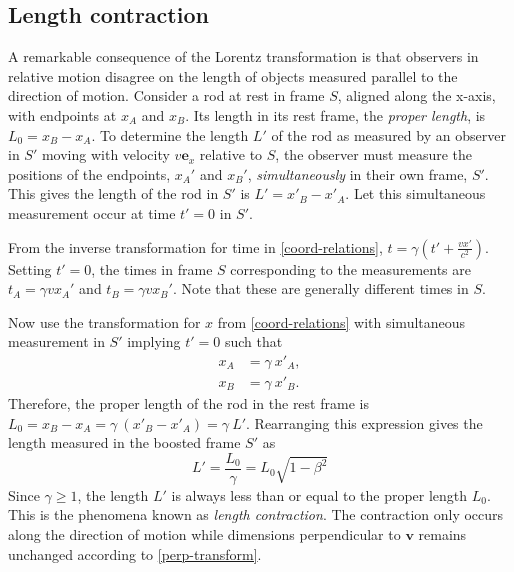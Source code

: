 \documentclass[a4paper]{article}
\begin{document}


\subsection{Length contraction}
A remarkable consequence of the Lorentz transformation is that observers in relative motion disagree on the length of objects measured parallel to the direction of motion. Consider a rod at rest in frame $S$, aligned along the x-axis, with endpoints at $x_A$ and $x_B$. Its length in its rest frame, the \textit{proper length}, is $L_0 = x_B - x_A$. To determine the length $L'$ of the rod as measured by an observer in $S'$ moving with velocity $v \mathbf{e}_x$ relative to $S$, the observer must measure the positions of the endpoints, $x_A'$ and $x_B'$, \textit{simultaneously} in their own frame, $S'$. This gives the length of the rod in $S'$ is $L' = x'_B - x'_A$. Let this simultaneous measurement occur at time $t'=0$ in $S'$.

From the inverse transformation for time in \eqref{coord-relations}, $t = \gamma(t' + \frac{vx'}{c^2})$. Setting $t'=0$, the times in frame $S$ corresponding to the measurements are $t_A = \gamma v x_A'$ and $t_B = \gamma v x_B'$. Note that these are generally different times in $S$. 

Now use the transformation for $x$ from \eqref{coord-relations} with simultaneous measurement in $S'$ implying $t'=0$ such that
\begin{align*}
    x_A &= \gamma \ x'_A, \\
    x_B &= \gamma \ x'_B.
\end{align*}
Therefore, the proper length of the rod in the rest frame is $L_0 = x_B - x_A = \gamma \ (x'_B - x'_A) = \gamma \ L'$. Rearranging this expression gives the length measured in the boosted frame $S'$ as
\begin{equation} \label{length-contraction}
    L' = \frac{L_0}{\gamma} = L_0 \sqrt{1-\beta^2}
\end{equation}
Since $\gamma \ge 1$, the length $L'$ is always less than or equal to the proper length $L_0$. This is the phenomena known as \textit{length contraction}. The contraction only occurs along the direction of motion while dimensions perpendicular to $\mathbf{v}$ remains unchanged according to \eqref{perp-transform}.
\end{document}
